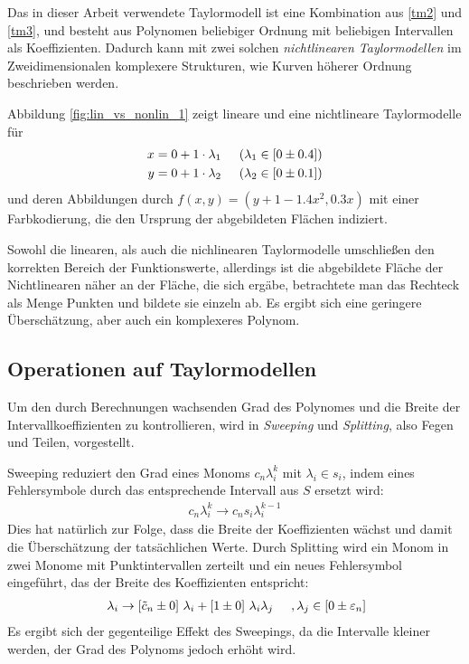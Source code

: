 Das in dieser Arbeit verwendete Taylormodell ist eine Kombination aus \ref{tm2} und \ref{tm3}, und besteht aus Polynomen beliebiger Ordnung mit beliebigen Intervallen als Koeffizienten. Dadurch kann mit zwei solchen \textit{nichtlinearen Taylormodellen} im Zweidimensionalen komplexere Strukturen, wie Kurven höherer Ordnung beschrieben werden.

Abbildung \ref{fig:lin_vs_nonlin_1} zeigt lineare und eine nichtlineare Taylormodelle für
\begin{align*}
x = 0 + 1 \cdot \lambda_1 & \hspace{0.5cm} (\lambda_1 \in [0 \pm 0.4]) \\
 y = 0 + 1 \cdot \lambda_2 & \hspace{0.5cm} (\lambda_2 \in [0 \pm 0.1])
\end{align*}
und deren Abbildungen durch $f(x,y) = (y + 1- 1.4 x^2,0.3x)$ mit einer Farbkodierung, die den Ursprung der abgebildeten Flächen indiziert.


Sowohl die linearen, als auch die nichlinearen Taylormodelle umschließen den korrekten Bereich der Funktionswerte, allerdings ist die abgebildete Fläche der Nichtlinearen näher an der Fläche, die sich ergäbe, betrachtete man das Rechteck als Menge Punkten und bildete sie einzeln ab. Es ergibt sich eine geringere Überschätzung, aber auch ein komplexeres Polynom.
\subsection{Operationen auf Taylormodellen}
Um den durch Berechnungen wachsenden Grad des Polynomes und die Breite der Intervallkoeffizienten zu kontrollieren, wird in \cite{DBLP:conf/macis/BrausseKM15} \textit{Sweeping} und \textit{Splitting}, also Fegen und Teilen, vorgestellt. 

Sweeping reduziert den Grad eines Monoms $c_n \lambda_i^k$ mit $\lambda_i \in s_i$, indem eines Fehlersymbole durch das entsprechende Intervall aus $S$ ersetzt wird: 
\begin{align*}
 c_n \lambda_i^k \rightarrow c_n s_i \lambda_i^{k-1}
\end{align*}
Dies hat natürlich zur Folge, dass die Breite der Koeffizienten wächst und damit die Überschätzung der tatsächlichen Werte. Durch Splitting wird ein Monom in zwei Monome mit Punktintervallen zerteilt und ein neues Fehlersymbol eingeführt, das der Breite des Koeffizienten entspricht:
\begin{align*}
 [\tilde{c}_n \pm \varepsilon_n]\ \lambda_i \rightarrow [\tilde{c}_n \pm 0]\ \lambda_i + [1 \pm 0]\ \lambda_i \lambda_j \hspace{0.5cm}, \lambda_j \in [0 \pm \varepsilon_n]
\end{align*}
Es ergibt sich der gegenteilige Effekt des Sweepings, da die Intervalle kleiner werden, der Grad des Polynoms jedoch erhöht wird.

